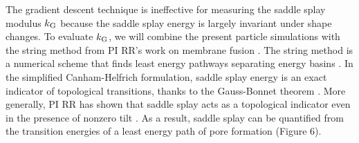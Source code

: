 %
The gradient descent technique is ineffective for measuring the saddle splay modulus $k_{\mathrm{G}}$ because
the saddle splay energy is largely invariant under shape changes.
To evaluate $k_{\mathrm{G}}$, we will combine the present particle simulations with the string method 
from PI RR's work on membrane fusion \cite{RyKlYaCo16}. The string method is a numerical scheme that finds
least energy pathways separating energy basins \cite{doi:10.1063/1.2720838}. 
In the simplified Canham-Helfrich formulation, saddle splay energy is an exact indicator of topological transitions, 
thanks to the  Gauss-Bonnet theorem \cite{TerziDeserno17}.
More generally, PI RR has shown that saddle splay acts as a topological indicator even in the presence of nonzero tilt \cite{RyKlYaCo16}. 
As a result, saddle splay can be quantified from the transition energies
of a least energy path of pore formation  (Figure 6).
%
%

